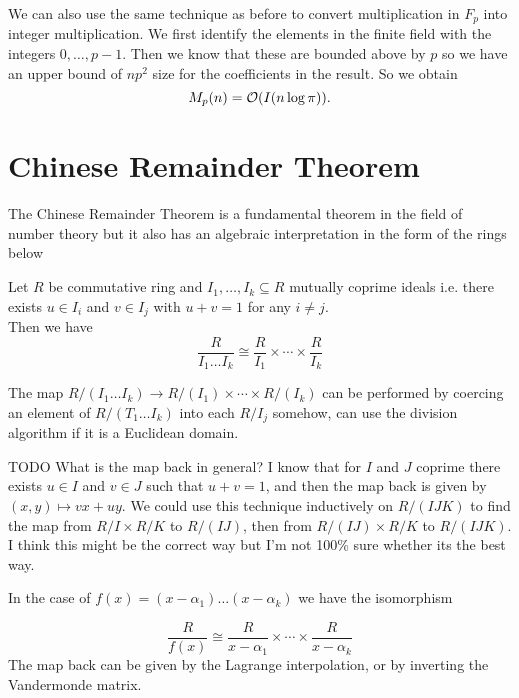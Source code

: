 We can also use the same technique as before to convert multiplication in $F_p$ into integer multiplication. We first identify the elements in the finite field with the integers $0,\ldots, p-1$. Then we know that these are bounded above by $p$ so we have an upper bound of $np^2$ size for the coefficients in the result. So we obtain
\[
    M_p(n) = \mathcal O(I(n \log \pi)).
\]

\section{Chinese Remainder Theorem}%
\label{sec:crt}

The Chinese Remainder Theorem is a fundamental theorem in the field of number theory but it also has an algebraic interpretation in the form of the rings below

\begin{theorem}
    Let $R$ be commutative ring and $I_1, \ldots, I_k \subseteq R$ mutually coprime ideals i.e. there exists $u \in I_i$ and $v \in I_j$ with $u + v = 1$ for any $i \neq j$.\\
    Then we have
    \[
        \frac{R}{I_1\ldots I_k} \cong \frac{R}{I_1} \times \cdots \times \frac{R}{I_k}
    \]
\end{theorem}

The map $R/(I_1\ldots I_k) \to R/(I_1) \times \cdots \times R/(I_k)$ can be performed by coercing an element of $R/(T_1 \ldots I_k)$ into each $R / I_j$ somehow, can use the division algorithm if it is a Euclidean domain. 

TODO What is the map back in general? I know that for $I$ and $J$ coprime there exists $u \in I$ and $v \in J$ such that $u + v = 1$, and then the map back is given by $(x, y) \mapsto vx + uy$. We could use this technique inductively on $R/(IJK)$ to find the map from $R / I \times R / K$ to $R / (IJ)$, then from $R / (IJ) \times R / K$ to $R / (IJK)$. I think this might be the correct way but I'm not 100\% sure whether its the best way.

In the case of $f(x) = (x - \alpha_1) \ldots (x - \alpha_k)$ we have the isomorphism

\[
    \frac{R}{f(x)} \cong \frac{R}{x - \alpha_1} \times \cdots \times \frac{R}{x - \alpha_k}
\]
The map back can be given by the Lagrange interpolation, or by inverting the Vandermonde matrix. 

